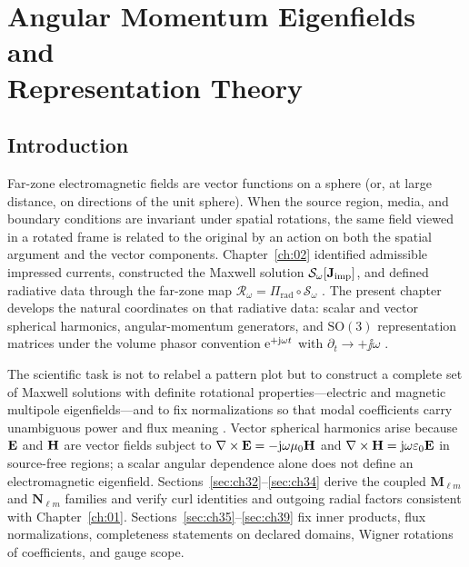 \chapter[Angular Momentum Eigenfields and Representation Theory]{Angular Momentum Eigenfields and\\Representation Theory}
\label{ch:03}
\setcounter{section}{-1}

\section{Introduction}
\label{sec:ch30}

Far-zone electromagnetic fields are vector functions on a sphere (or, at large distance, on directions of the unit sphere). When the source region, media, and boundary conditions are invariant under spatial rotations, the same field viewed in a rotated frame is related to the original by an action on both the spatial argument and the vector components. Chapter~\ref{ch:02} identified admissible impressed currents, constructed the Maxwell solution $\mathcal{S}_\omega[\mathbf{J}_{\mathrm{imp}}]$, and defined radiative data through the far-zone map $\mathcal{R}_\omega=\Pi_{\mathrm{rad}}\circ\mathcal{S}_\omega$ \cite{stratton1941}. The present chapter develops the natural coordinates on that radiative data: scalar and vector spherical harmonics, angular-momentum generators, and $\mathrm{SO}(3)$ representation matrices under the volume phasor convention $\mathrm{e}^{+\mathrm{j}\omega t}$ with $\partial_t\to+\jj\omega$ \cite{jackson1999,stratton1941}.

The scientific task is not to relabel a pattern plot but to construct a complete set of Maxwell solutions with definite rotational properties---electric and magnetic multipole eigenfields---and to fix normalizations so that modal coefficients carry unambiguous power and flux meaning \cite{harrington2001,beth1936}. Vector spherical harmonics arise because $\mathbf{E}$ and $\mathbf{H}$ are vector fields subject to $\nabla\times\mathbf{E}=-\mathrm{j}\omega\mu_0\mathbf{H}$ and $\nabla\times\mathbf{H}=\mathrm{j}\omega\varepsilon_0\mathbf{E}$ in source-free regions; a scalar angular dependence alone does not define an electromagnetic eigenfield. Sections~\ref{sec:ch32}--\ref{sec:ch34} derive the coupled $\mathbf{M}_{\ell m}$ and $\mathbf{N}_{\ell m}$ families and verify curl identities and outgoing radial factors consistent with Chapter~\ref{ch:01}. Sections~\ref{sec:ch35}--\ref{sec:ch39} fix inner products, flux normalizations, completeness statements on declared domains, Wigner rotations of coefficients, and gauge scope.

